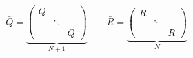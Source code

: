 \documentclass{article}
\begin{document}
\thispagestyle{empty}
$$
\bar{Q} = \underbrace{\begin{pmatrix}Q & & \\ & \ddots & \\ & & Q\end{pmatrix}}_{N+1}
\qquad
\bar{R} = \underbrace{\begin{pmatrix}R & & \\ & \ddots & \\ & & R\end{pmatrix}}_{N}
$$
\end{document}
